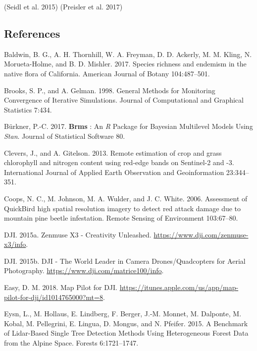 \documentclass[]{article}
\begin{document}
(Seidl et al. 2015) (Preisler et al. 2017)

\subsection*{References}\label{references}

\hypertarget{refs}{}
\hypertarget{ref-baldwin2017a}{}
Baldwin, B. G., A. H. Thornhill, W. A. Freyman, D. D. Ackerly, M. M.
Kling, N. Morueta-Holme, and B. D. Mishler. 2017. Species richness and
endemism in the native flora of California. American Journal of Botany
104:487--501.

\hypertarget{ref-brooks1998}{}
Brooks, S. P., and A. Gelman. 1998. General Methods for Monitoring
Convergence of Iterative Simulations. Journal of Computational and
Graphical Statistics 7:434.

\hypertarget{ref-burkner2017}{}
Bürkner, P.-C. 2017. \textbf{Brms} : An \emph{R} Package for Bayesian
Multilevel Models Using \emph{Stan}. Journal of Statistical Software 80.

\hypertarget{ref-clevers2013}{}
Clevers, J., and A. Gitelson. 2013. Remote estimation of crop and grass
chlorophyll and nitrogen content using red-edge bands on Sentinel-2 and
-3. International Journal of Applied Earth Observation and
Geoinformation 23:344--351.

\hypertarget{ref-coops2006}{}
Coops, N. C., M. Johnson, M. A. Wulder, and J. C. White. 2006.
Assessment of QuickBird high spatial resolution imagery to detect red
attack damage due to mountain pine beetle infestation. Remote Sensing of
Environment 103:67--80.

\hypertarget{ref-dji2015}{}
DJI. 2015a. Zenmuse X3 - Creativity Unleashed.
\url{https://www.dji.com/zenmuse-x3/info}.

\hypertarget{ref-dji2015a}{}
DJI. 2015b. DJI - The World Leader in Camera Drones/Quadcopters for
Aerial Photography. \url{https://www.dji.com/matrice100/info}.

\hypertarget{ref-dronesmadeeasy2018}{}
Easy, D. M. 2018. ‎Map Pilot for DJI.
\url{https://itunes.apple.com/us/app/map-pilot-for-dji/id1014765000?mt=8}.

\hypertarget{ref-eysn2015}{}
Eysn, L., M. Hollaus, E. Lindberg, F. Berger, J.-M. Monnet, M. Dalponte,
M. Kobal, M. Pellegrini, E. Lingua, D. Mongus, and N. Pfeifer. 2015. A
Benchmark of Lidar-Based Single Tree Detection Methods Using
Heterogeneous Forest Data from the Alpine Space. Forests 6:1721--1747.
\end{document}
